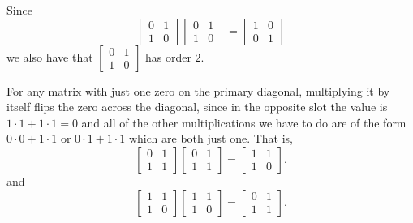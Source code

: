 \documentclass[12 pt, letterpaper]{hmcpset}
\begin{document}
\begin{solution}
	Since
	\[
		\begin{bmatrix}
			0 & 1 \\
			1 & 0
		\end{bmatrix} 
		\begin{bmatrix}
			0 & 1 \\				
			1 & 0
		\end{bmatrix} = 
		\begin{bmatrix}
			1 & 0 \\
			0 & 1
		\end{bmatrix}
	\]
	we also have that $\begin{bmatrix}
			0 & 1 \\
			1 & 0
		\end{bmatrix}$ has order $2$. 

	For any matrix with just one zero on the primary diagonal, multiplying it by itself flips the zero across the diagonal, since in the opposite slot the value is $1 \cdot 1 + 1 \cdot 1 = 0$ and all of the other multiplications we have to do are of the form $0 \cdot 0 + 1 \cdot 1$ or $0 \cdot 1 + 1 \cdot 1$ which are both just one. That is,
	\[
		\begin{bmatrix}
			0 & 1 \\
			1 & 1
		\end{bmatrix}
		\begin{bmatrix}
			0 & 1 \\
			1 & 1
		\end{bmatrix} = 
		\begin{bmatrix}
			1 & 1 \\
			1 & 0
		\end{bmatrix}.
	\]
	and
	\[
		\begin{bmatrix}
			1 & 1 \\
			1 & 0
		\end{bmatrix}
		\begin{bmatrix}
			1 & 1 \\
			1 & 0
		\end{bmatrix} = 
		\begin{bmatrix}
			0 & 1 \\
			1 & 1
		\end{bmatrix}.
	\] 


\end{solution}
\end{document}
